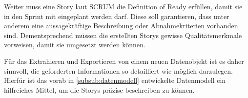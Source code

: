 Weiter muss eine Story laut SCRUM die \glqq Definition of Ready\grqq{} erfüllen, damit sie in den Sprint mit eingeplant werden darf.
Diese soll garantieren, dass unter anderem eine aussagekräftige Beschreibung oder Abnahmekriterien vorhanden sind.
Dementsprechend müssen die erstellten Storys gewisse Qualitätsmerkmale vorweisen, damit sie umgesetzt werden können.

Für das Extrahieren und Exportieren von einem neuen Datenobjekt ist es daher sinnvoll, die geforderten Informationen so detailliert wie möglich darzulegen.
Hierfür ist das vorab in \ref{subsub:datenmodell} entwickelte Datenmodell ein hilfreiches Mittel, um die Storys präzise beschreiben zu können.

\begin{table}[hbt]
\centering
{}
\caption[Gefordertes Exportformat am Beispiel der CPR-Daten]{Auf Basis des entworfenen Datenmodells erstellte Tabelle für das geforderte Export-Format am Beispiel von \gls{CPR}-Daten}
\label{tbl:export}
\end{table}

